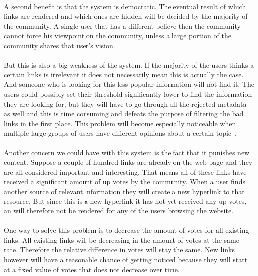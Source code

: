 		\paragraph{}
		A second benefit is that the system is democratic. The eventual result of which links are rendered and which ones are hidden will be decided by the majority of the community. A single user that has a different believe then the community cannot force his viewpoint on the community, unless a large portion of the community shares that user's vision.
		\paragraph{}
		But this is also a big weakness of the system. If the majority of the users thinks a certain links is irrelevant it does not necessarily mean this is actually the case. And someone who is looking for this less popular information will not find it. The users could possibly set their threshold significantly lower to find the information they are looking for, but they will have to go through all the rejected metadata as well and this is time consuming and defeats the purpose of filtering the bad links in the first place. This problem will become especially noticeable when multiple large groups of users have different opinions about a certain topic~\cite{sumi2011edit}.
		\paragraph{}
		Another concern we could have with this system is the fact that it punishes new content. Suppose a couple of hundred links are already on the web page and they are all considered important and interesting. That means all of these links have received a significant amount of up votes by the community. When a user finds another source of relevant information they will create a new hyperlink to that resource. But since this is a new hyperlink it has not yet received any up votes, an will therefore not be rendered for any of the users browsing the website.
		\paragraph{}
		One way to solve this problem is to decrease the amount of votes for all existing links. All existing links will be decreasing in the amount of votes at the same rate. Therefore the relative difference in votes will stay the same. New links however will have a reasonable chance of getting noticed because they will start at a fixed value of votes that does not decrease over time.
